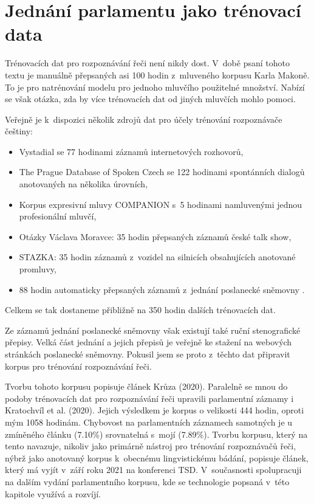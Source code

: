 \chapter{Jednání parlamentu jako trénovací data}
\label{kap:svolocz}

Trénovacích dat pro rozpoznávání řeči není nikdy dost. V~době psaní tohoto textu
je manuálně přepsaných asi 100 hodin z~mluveného korpusu Karla Makoně. To je pro
natrénování modelu pro jednoho mluvčího použitelné množství. Nabízí se však otázka,
zda by více trénovacích dat od jiných mluvčích mohlo pomoci.

Veřejně je k~dispozici několik zdrojů dat pro účely trénování
rozpoznávače češtiny:
\begin{itemize}
\item{
    Vystadial\cite{vystadialarticle} se 77 hodinami záznamů internetových
    rozhovorů\cite{vystadialdata},
}
\item{
    The Prague Database of Spoken Czech\cite{pdtscarticle} se 122 hodinami
    spontánních dialogů anotovaných na několika úrovních\cite{pdtscdata},
}
\item{
    Korpus expresivní mluvy COMPANION s~5 hodinami namluvenými jednou
    profesionální mluvčí\cite{companiondata},
}
\item{
    Otázky Václava Moravce: 35 hodin přepsaných záznamů české talk
    show\cite{ovmdata},
}
\item{
    STAZKA: 35 hodin záznamů z~vozidel na silnicích obsahujících anotované
    promluvy\cite{stazkadata},
}
\item{
    88 hodin automaticky přepsaných záznamů z~jednání poslanecké
    sněmovny \cite{pspdata}.
}
\end{itemize}
Celkem se tak dostaneme přibližně na 350 hodin dalších trénovacích dat.

Ze záznamů jednání poslanecké sněmovny však existují také ruční stenografické
přepisy. Velká část jednání a jejich přepisů je veřejně ke stažení na webových
stránkách poslanecké sněmovny. Pokusil jsem se proto z~těchto dat připravit
korpus pro trénování rozpoznávání řeči.


Tvorbu tohoto korpusu popisuje článek Krůza (2020)\cite{FedCSIS2020119}.
Paralelně se mnou do podoby trénovacích
dat pro rozpoznávání řeči upravili parlamentní záznamy i Kratochvíl et al.
(2020)\cite{kratochvil2020large}. Jejich výsledkem je korpus o velikosti 444
hodin, oproti mým 1058 hodinám. Chybovost na parlamentních záznamech samotných
je u zmíněného článku (7.10\%) srovnatelná s~mojí (7.89\%).
Tvorbu korpusu, který na tento navazuje, nikoliv jako primárně nástroj pro trénování
rozpoznávačů řeči, nýbrž jako anotovaný korpus k~obecnému lingvistickému bádání,
popisuje článek, který má vyjít v~září roku 2021 na konferenci TSD\cite{tsd2021parczech}.
V~současnosti spolupracuji na dalším vydání parlamentního korpusu, kde se
technologie popsaná v~této kapitole využívá a rozvíjí.

